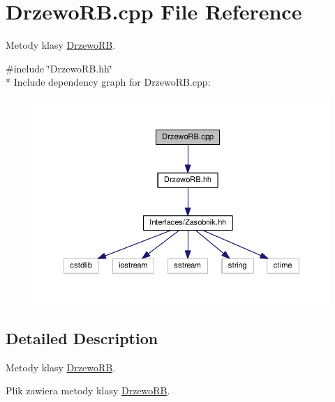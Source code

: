 \hypertarget{a00039}{}\section{Drzewo\+R\+B.\+cpp File Reference}
\label{a00039}


Metody klasy \hyperlink{a00011}{Drzewo\+R\+B}.  


{\ttfamily \#include \char`\"{}Drzewo\+R\+B.\+hh\char`\"{}}\\*
Include dependency graph for Drzewo\+R\+B.\+cpp\+:
\nopagebreak
\begin{figure}[H]
\begin{center}
\leavevmode
\includegraphics[width=350pt]{a00089}
\end{center}
\end{figure}


\subsection{Detailed Description}
Metody klasy \hyperlink{a00011}{Drzewo\+R\+B}. 

Plik zawiera metody klasy \hyperlink{a00011}{Drzewo\+R\+B}. 